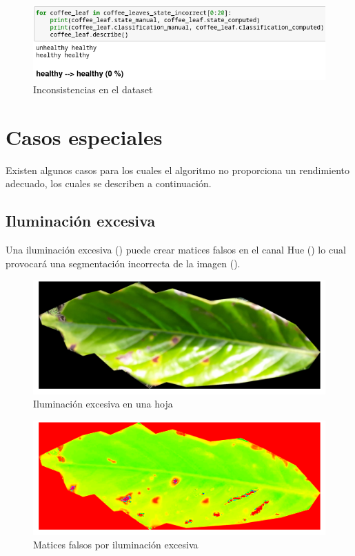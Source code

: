 \begin{figure}[H]
\centering
\includegraphics[width=\textwidth]{images/consideration_tag_error.png}
\caption{Inconsistencias en el dataset}
\label{img:dataset_inconsistencies}
\end{figure}

\section{Casos especiales}
Existen algunos casos para los cuales el algoritmo no proporciona un rendimiento adecuado, los cuales se describen a continuación.

\subsection{Iluminación excesiva}
Una iluminación excesiva () puede crear matices falsos en el canal Hue () lo cual provocará una segmentación incorrecta de la imagen ().

\begin{figure}[H]
\centering
\includegraphics[scale=1]{images/special_case_light_1_rgb.png}
\caption{Iluminación excesiva en una hoja}
\label{img:light_1_rgb}
\end{figure}

\begin{figure}[H]
\centering
\includegraphics[scale=1]{images/special_case_light_1_hue.png}
\caption{Matices falsos por iluminación excesiva}
\label{img:light_1_hue}
\end{figure}

